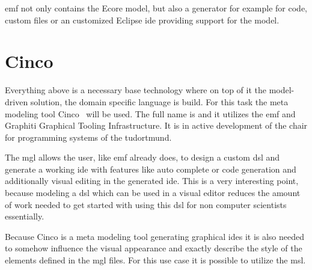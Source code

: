 \gls{emf} not only contains the Ecore model, but also a generator for example for code, custom files or an customized Eclipse \gls{ide} providing support for the model.


\section{Cinco}
Everything above is a necessary base technology where on top of it the model-driven solution, the domain specific language is build. For this task the meta modeling tool Cinco~\cite{CincoHomepage} will be used. The full name is  and it utilizes the \gls{emf} and Graphiti Graphical Tooling Infrastructure. It is in active development of the chair for programming systems of the \gls{tudortmund}.

The \gls{mgl} allows the user, like \gls{emf} already does, to design a custom \gls{dsl} and generate a working \gls{ide} with features like auto complete or code generation and additionally visual editing in the generated \gls{ide}. This is a very interesting point, because modeling a \gls{dsl} which can be used in a visual editor reduces the amount of work needed to get started with using this \gls{dsl} for non computer scientists essentially. 

Because Cinco is a meta modeling tool generating graphical \glspl{ide} it is also needed to somehow influence the visual appearance and exactly describe the style of the elements defined in the \gls{mgl} files. For this use case it is possible to utilize the \gls{msl}.

